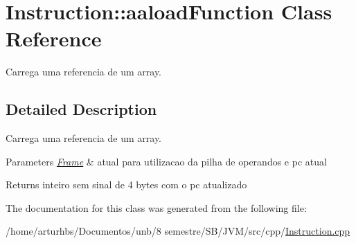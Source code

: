 \hypertarget{classInstruction_1_1aaloadFunction}{}\section{Instruction\+:\+:aaload\+Function Class Reference}
\label{classInstruction_1_1aaloadFunction}


Carrega uma referencia de um array.  




\subsection{Detailed Description}
Carrega uma referencia de um array. 


\begin{DoxyParams}{Parameters}
{\em \hyperlink{classFrame}{Frame}} & atual para utilizacao da pilha de operandos e pc atual \\
\hline
\end{DoxyParams}
\begin{DoxyReturn}{Returns}
inteiro sem sinal de 4 bytes com o pc atualizado 
\end{DoxyReturn}


The documentation for this class was generated from the following file\+:\begin{DoxyCompactItemize}
\item 
/home/arturhbs/\+Documentos/unb/8 semestre/\+S\+B/\+J\+V\+M/src/cpp/\hyperlink{Instruction_8cpp}{Instruction.\+cpp}\end{DoxyCompactItemize}
